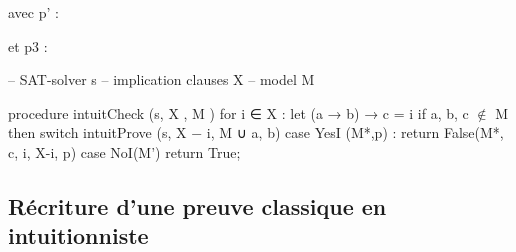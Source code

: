 avec p' :
\begin{prooftree}
\end{prooftree}

et p3 :
\begin{prooftree}
\end{prooftree}



-- SAT-solver s
-- implication clauses X
-- model M

\begin{listing}[1]{1}
procedure intuitCheck (s, X , M )
    for i ∈ X :
        let (a → b) → c = i
        if a, b, c $\notin$ M then
            switch intuitProve (s, X − {i}, M ∪ {a}, b)
                case YesI (M*,p) :
                    return False(M*, c, i, X-{i}, p)
                case NoI(M')
                return True;
\end{listing}
                
\subsection{R\'ecriture d'une preuve classique en intuitionniste}

